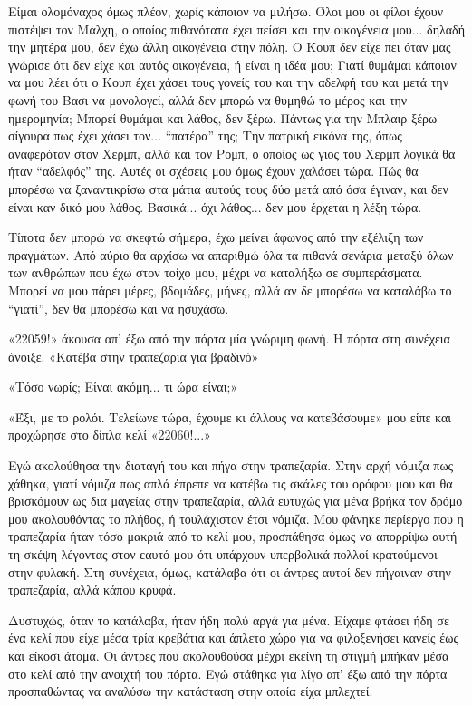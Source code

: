 \documentclass[12pt,twoside, openany]{book}
\begin{document}
Είμαι ολομόναχος όμως πλέον, χωρίς κάποιον να μιλήσω. Όλοι μου οι φίλοι έχουν πιστέψει τον Μαλχη, ο οποίος πιθανότατα έχει πείσει και την οικογένεια μου... δηλαδή την μητέρα μου, δεν έχω άλλη οικογένεια στην πόλη. Ο Κουπ δεν είχε πει όταν μας γνώρισε ότι δεν είχε και αυτός οικογένεια, ή είναι η ιδέα μου; Γιατί θυμάμαι κάποιον να μου λέει ότι ο Κουπ έχει χάσει τους γονείς του και την αδελφή του και μετά την φωνή του Βασι να μονολογεί, αλλά δεν μπορώ να θυμηθώ το μέρος και την ημερομηνία; Μπορεί θυμάμαι και λάθος, δεν ξέρω. Πάντως για την Μπλαιρ ξέρω σίγουρα πως έχει χάσει τον... “πατέρα” της; Την πατρική εικόνα της, όπως αναφερόταν στον Χερμπ, αλλά και τον Ρομπ, ο οποίος ως γιος του Χερμπ λογικά θα ήταν “αδελφός” της. Αυτές οι σχέσεις μου όμως έχουν χαλάσει τώρα. Πώς θα μπορέσω να ξαναντικρίσω στα μάτια αυτούς τους δύο μετά από όσα έγιναν, και δεν είναι καν δικό μου λάθος. Βασικά... όχι λάθος... δεν μου έρχεται η λέξη τώρα. 

Τίποτα δεν μπορώ να σκεφτώ σήμερα, έχω μείνει άφωνος από την εξέλιξη των πραγμάτων. Από αύριο θα αρχίσω να απαριθμώ όλα τα πιθανά σενάρια μεταξύ όλων των ανθρώπων που έχω στον τοίχο μου, μέχρι να καταλήξω σε συμπεράσματα. Μπορεί να μου πάρει μέρες, βδομάδες, μήνες, αλλά αν δε μπορέσω να καταλάβω το “γιατί”, δεν θα μπορέσω και να ησυχάσω.

«22059!» άκουσα απ’ έξω από την πόρτα μία γνώριμη φωνή. Η πόρτα στη συνέχεια άνοιξε. «Κατέβα στην τραπεζαρία για βραδινό»

«Τόσο νωρίς; Είναι ακόμη... τι ώρα είναι;»

«Έξι, με το ρολόι. Τελείωνε τώρα, έχουμε κι άλλους να κατεβάσουμε» μου είπε και προχώρησε στο δίπλα κελί «22060!...»

Εγώ ακολούθησα την διαταγή του και πήγα στην τραπεζαρία. Στην αρχή νόμιζα πως χάθηκα, γιατί νόμιζα πως απλά έπρεπε να κατέβω τις σκάλες του ορόφου μου και θα βρισκόμουν ως δια μαγείας στην τραπεζαρία, αλλά ευτυχώς για μένα βρήκα τον δρόμο μου ακολουθόντας το πλήθος, ή τουλάχιστον έτσι νόμιζα. Μου φάνηκε περίεργο που η τραπεζαρία ήταν τόσο μακριά από το κελί μου, προσπάθησα όμως να απορρίψω αυτή τη σκέψη λέγοντας στον εαυτό μου ότι υπάρχουν υπερβολικά πολλοί κρατούμενοι στην φυλακή. Στη συνέχεια, όμως, κατάλαβα ότι οι άντρες αυτοί δεν πήγαιναν στην τραπεζαρία, αλλά κάπου κρυφά. 

Δυστυχώς, όταν το κατάλαβα, ήταν ήδη πολύ αργά για μένα. Είχαμε φτάσει ήδη σε ένα κελί που είχε μέσα τρία κρεβάτια και άπλετο χώρο για να φιλοξενήσει κανείς έως και είκοσι άτομα. Οι άντρες που ακολουθούσα μέχρι εκείνη τη στιγμή μπήκαν μέσα στο κελί από την ανοιχτή του πόρτα. Εγώ στάθηκα για λίγο απ’ έξω από την πόρτα προσπαθώντας να αναλύσω την κατάσταση στην οποία είχα μπλεχτεί.
\end{document}
